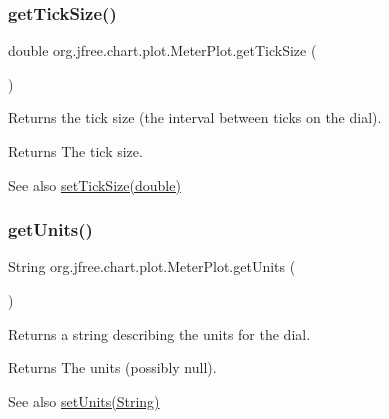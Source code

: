 \subsubsection{\texorpdfstring{get\+Tick\+Size()}{getTickSize()}}
{\footnotesize\ttfamily double org.\+jfree.\+chart.\+plot.\+Meter\+Plot.\+get\+Tick\+Size (\begin{DoxyParamCaption}{ }\end{DoxyParamCaption})}

Returns the tick size (the interval between ticks on the dial).

\begin{DoxyReturn}{Returns}
The tick size.
\end{DoxyReturn}
\begin{DoxySeeAlso}{See also}
\mbox{\hyperlink{classorg_1_1jfree_1_1chart_1_1plot_1_1_meter_plot_a98f1e32669767d46e910c12afa1236ac}{set\+Tick\+Size(double)}} 
\end{DoxySeeAlso}
\mbox{\label{classorg_1_1jfree_1_1chart_1_1plot_1_1_meter_plot_a905469866f0465792ee58a17a9eb221a}} 
\subsubsection{\texorpdfstring{get\+Units()}{getUnits()}}
{\footnotesize\ttfamily String org.\+jfree.\+chart.\+plot.\+Meter\+Plot.\+get\+Units (\begin{DoxyParamCaption}{ }\end{DoxyParamCaption})}

Returns a string describing the units for the dial.

\begin{DoxyReturn}{Returns}
The units (possibly {\ttfamily null}).
\end{DoxyReturn}
\begin{DoxySeeAlso}{See also}
\mbox{\hyperlink{classorg_1_1jfree_1_1chart_1_1plot_1_1_meter_plot_acb00315501970dbaaab783969c621103}{set\+Units(\+String)}} 
\end{DoxySeeAlso}
\mbox{\label{classorg_1_1jfree_1_1chart_1_1plot_1_1_meter_plot_a12d73d067c872a15f1514c43b642c774}} 
